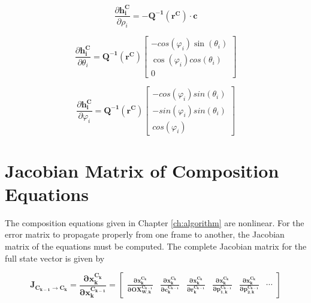 \begin{equation}
\frac{\partial \boldsymbol{h_i^{C}}}{\partial \rho _{i}}=-\boldsymbol{Q^{-1}(r^{C})\cdot c}
\end{equation}


\begin{equation}
\frac{\partial \boldsymbol{h_i^{C}}}{\partial \theta _{i}}=
\boldsymbol{Q^{-1}(r^{C})} \begin{bmatrix}
-cos(\varphi _{i})\sin(\theta _{i}) \\
\cos (\varphi _{i})cos(\theta _{i}) \\
0 \end{bmatrix}
\end{equation}

\begin{equation}
\frac{\partial \boldsymbol{h_i^{C}}}{\partial \varphi _{i}}= 
\boldsymbol{Q^{-1}(r^{C})} \begin{bmatrix}
-cos(\varphi _{i})sin(\theta _{i}) \\
-sin(\varphi _{i})sin(\theta _{i}) \\
cos(\varphi _{i})
\end{bmatrix}
\end{equation}

\section{Jacobian Matrix of Composition Equations}
\label{sec:jac_composition}

The composition equations given in Chapter \ref{ch:algorithm} are
nonlinear. For the error matrix to propagate properly from one
frame to another, the Jacobian matrix of the equations must be
computed. The complete Jacobian matrix for the full state vector is
given by 

\begin{equation}
  \boldsymbol{J_{C_{k-1}\to C_{k}}}=
  \boldsymbol{\frac{\partial x_k^{C_k}}{\partial x_k^{C_{k-1}}}}
  =\begin{bmatrix}
    \boldsymbol{\frac{\partial x_{k}^{C_k}}{\partial OX_{W, k}^{C_{k-1}}}} &
    \boldsymbol{\frac{\partial x_{k}^{C_k}}{\partial c_{k}^{C_{k-1}}}} & 
    \boldsymbol{\frac{\partial x_{k}^{C_k}}{\partial r_{k}^{C_{k-1}}}} & 
    \boldsymbol{\frac{\partial x_{k}^{C_k}}{\partial p_{1, k}^{C_{k-1}}}} &
    \boldsymbol{\frac{\partial x_{k}^{C_k}}{\partial p_{2, k}^{C_{k-1}}}} &
    \cdots 
\end{bmatrix}
\end{equation}

